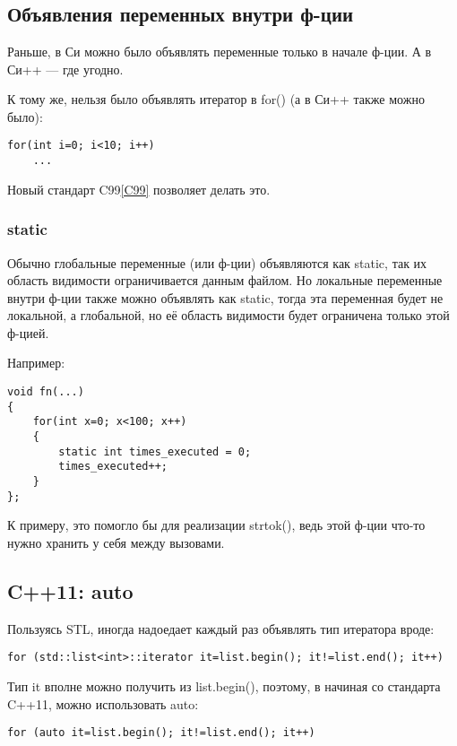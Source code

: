 ﻿\chapter{}
\section{Объявления переменных внутри ф-ции}

Раньше, в Си можно было объявлять переменные только в начале ф-ции. А в Си++ --- где угодно.

К тому же, нельзя было объявлять итератор в for() (а в Си++ также можно было):

\begin{lstlisting}
for(int i=0; i<10; i++)
	...
\end{lstlisting}

Новый стандарт C99\ref{C99} позволяет делать это.

\subsection{static}

Обычно глобальные переменные (или ф-ции) объявляются как static, так их область видимости ограничивается 
данным файлом. Но локальные переменные внутри ф-ции также можно объявлять как static, тогда эта переменная
будет не локальной, а глобальной, но её область видимости будет ограничена только этой ф-цией.

Например:

\begin{lstlisting}
void fn(...)
{
	for(int x=0; x<100; x++)
	{
		static int times_executed = 0;
		times_executed++;
	}
};
\end{lstlisting}

К примеру, это помогло бы для реализации strtok(), ведь этой ф-ции что-то нужно хранить у себя между вызовами.


\section{C++11: auto}

Пользуясь \ac{STL}, иногда надоедает каждый раз объявлять тип итератора вроде:

\begin{lstlisting}
for (std::list<int>::iterator it=list.begin(); it!=list.end(); it++)
\end{lstlisting}

Тип it вполне можно получить из list.begin(), поэтому, в начиная со стандарта C++11, можно использовать auto:

\begin{lstlisting}
for (auto it=list.begin(); it!=list.end(); it++)
\end{lstlisting}

